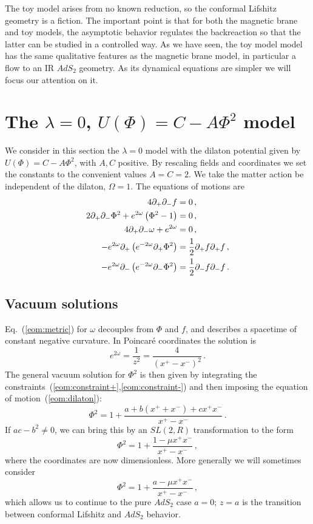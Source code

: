 \documentclass[12pt]{article}
\newcommand{\sect}[1]{\section{#1}\setcounter{equation}{0}}
\newcommand{\be}{\begin{equation}}
\newcommand{\ee}{\end{equation}}
\begin{document}
The toy model arises from no known reduction, so the conformal Lifshitz geometry is a fiction.  The important point is that for both the magnetic brane and toy models, the asymptotic behavior regulates the backreaction so that the latter can be studied in a controlled way.  As we have seen, the toy model model has the same qualitative features as the magnetic brane model, in particular a flow to an IR $AdS_2$ geometry.  As its dynamical equations are simpler we will focus our attention on it.


\sect{The $\lambda = 0$, $U(\Phi) = C-A \Phi^2 $ model}

We consider in this section the $\lambda = 0$ model with the dilaton potential given by $U(\Phi) = C-A \Phi^2$, with $A, C$ positive.  By rescaling fields and coordinates we set the constants to the convenient values $A= C=2$.
We take the matter action be independent of the dilaton, $\Omega = 1$. The equations of motions are
\begin{align}
4 \partial_+ \partial_- f &= 0  \,,\label{eom:scalar}\\
2 \partial_+ \partial_- \Phi^2+ e^{2 \omega}  \left( \Phi^2 - 1\right) &= 0 \,,\label{eom:dilaton}\\
4 \partial_+ \partial_- \omega +  {e^{2 \omega} } &= 0 \,,\label{eom:metric}\\
-e^{2 \omega} \partial_+ \left( e^{-2 \omega} \partial_+ \Phi^2 \right) &= {1 \over 2} \partial_+ f \partial_+ f \,,\label{eom:constraint+}\\
-e^{2 \omega} \partial_- \left( e^{-2 \omega} \partial_- \Phi^2 \right)& = {1 \over 2} \partial_- f \partial_- f \,.\label{eom:constraint-}
\end{align}

\subsection{Vacuum solutions}

Eq.~(\ref{eom:metric}) for $\omega$ decouples from $\Phi$ and $f$, and describes a spacetime of constant negative curvature.  In Poincar\'e coordinates the solution is
\be
e^{2\omega} = \frac{1}{z^2}  = \frac{4}{(x^+ - x^-)^2} \,. \label{met1}
\ee 
The general vacuum solution for $\Phi^2$ is then given by integrating the constraints~(\ref{eom:constraint+},\ref{eom:constraint-}) and then imposing the equation of motion~(\ref{eom:dilaton}):
\be
\Phi^2 = 1 + \frac{a + b(x^+ + x^-) + cx^+ x^-}{x^+ - x^-} \,. \label{phi1}
\ee
If $ac - b^2 \neq 0$, we can bring this by an $SL(2,R)$ transformation to the form
\be
\Phi^2 = 1 + \frac{1  - \mu x^+ x^-}{x^+ - x^-} \,, \label{phi2}
\ee
where the coordinates are now dimensionless.  
More generally we will sometimes consider
\be
\Phi^2 = 1 + \frac{a  - \mu x^+ x^-}{x^+ - x^-} \, ,\label{phi3}
\ee
which allows us to continue to the pure $AdS_2$ case $a=0$; $z=a$ is the transition between conformal Lifshitz and $AdS_2$ behavior.
\end{document}
